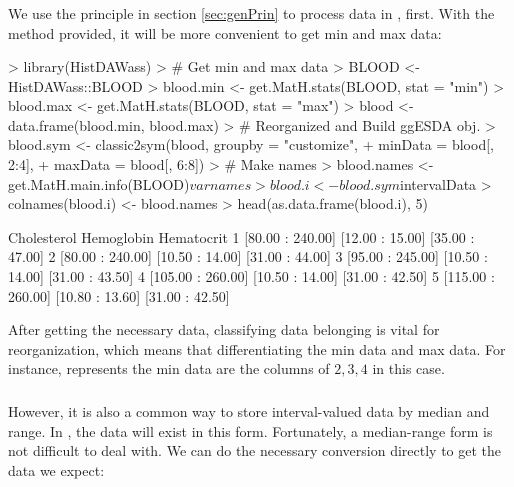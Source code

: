 \documentclass[article]{jss}
\begin{document}
\subsubsection[HistDAWass]{}

We use the principle in section \ref{sec:genPrin} to process  data in , first. With the method  provided, it will be more convenient to get min and max data:

\begin{Schunk}
\begin{Sinput}
> library(HistDAWass)
> # Get min and max data
> BLOOD <- HistDAWass::BLOOD
> blood.min <- get.MatH.stats(BLOOD, stat = "min")
> blood.max <- get.MatH.stats(BLOOD, stat = "max")
> blood <- data.frame(blood.min, blood.max)
> # Reorganized and Build ggESDA obj.
> blood.sym <- classic2sym(blood, groupby = "customize",
+                      minData = blood[, 2:4],
+                      maxData = blood[, 6:8])
> # Make names
> blood.names <- get.MatH.main.info(BLOOD)$varnames
> blood.i <- blood.sym$intervalData
> colnames(blood.i) <- blood.names
> head(as.data.frame(blood.i), 5)
\end{Sinput}
\begin{Soutput}
        Cholesterol      Hemoglobin      Hematocrit
1  [80.00 : 240.00] [12.00 : 15.00] [35.00 : 47.00]
2  [80.00 : 240.00] [10.50 : 14.00] [31.00 : 44.00]
3  [95.00 : 245.00] [10.50 : 14.00] [31.00 : 43.50]
4 [105.00 : 260.00] [10.50 : 14.00] [31.00 : 42.50]
5 [115.00 : 260.00] [10.80 : 13.60] [31.00 : 42.50]
\end{Soutput}
\end{Schunk}

After getting the necessary data, classifying data belonging is vital for reorganization, which means that differentiating the min data and max data. For instance,  represents the min data are the columns of $2,3,4$ in this case.

\subsubsection[MAINT.Data]{}

However, it is also a common way to store interval-valued data by median and range. In , the data will exist in this form. Fortunately, a median-range form is not difficult to deal with. We can do the necessary conversion directly to get the data we expect:
\end{document}
